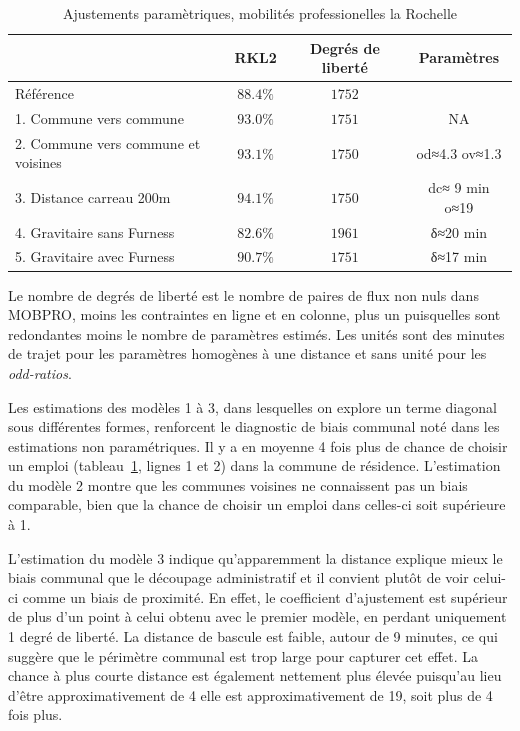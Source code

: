 \documentclass[
  10pt,
  a4paper,
  numbers=noendperiod,
  DIV=9]{scrartcl}
\begin{document}
\hypertarget{tbl-meapsR2-p}{}
\setlength{\LTpost}{0mm}
\begin{longtable}{lccc}
\caption{\label{tbl-meapsR2-p}Ajustements paramètriques, mobilités professionelles la Rochelle }\tabularnewline

\toprule
 & RKL2 & Degrés de liberté & Paramètres \\ 
\midrule
 Référence & $88.4\%$ & $1 752$ &  \\ 
1. Commune vers commune & $93.0\%$ & $1 751$ & NA \\ 
2. Commune vers commune et voisines & $93.1\%$ & $1 750$ & od≈4.3 ov≈1.3 \\ 
3. Distance carreau 200m & $94.1\%$ & $1 750$ & dc≈ 9 min o≈19 \\ 
4. Gravitaire sans Furness & $82.6\%$ & $1 961$ & δ≈20 min \\ 
5. Gravitaire avec Furness & $90.7\%$ & $1 751$ & δ≈17 min \\ 
\bottomrule
\end{longtable}
\begin{minipage}{\linewidth}
Le nombre de degrés de liberté est le nombre de paires de flux non nuls dans MOBPRO, moins les contraintes en ligne et en colonne, plus un puisqu\textquotesingle{}elles sont redondantes moins le nombre de paramètres estimés. Les unités sont des minutes de trajet pour les paramètres homogènes à une distance et sans unité pour les \emph{odd-ratios}.\\
\end{minipage}

Les estimations des modèles 1 à 3, dans lesquelles on explore un terme
diagonal sous différentes formes, renforcent le diagnostic de biais
communal noté dans les estimations non paramétriques. Il y a en moyenne
4 fois plus de chance de choisir un emploi (tableau~\ref{tbl-meapsR2-p},
lignes 1 et 2) dans la commune de résidence. L'estimation du modèle 2
montre que les communes voisines ne connaissent pas un biais comparable,
bien que la chance de choisir un emploi dans celles-ci soit supérieure à
1.

L'estimation du modèle 3 indique qu'apparemment la distance explique
mieux le biais communal que le découpage administratif et il convient
plutôt de voir celui-ci comme un biais de proximité. En effet, le
coefficient d'ajustement est supérieur de plus d'un point à celui obtenu
avec le premier modèle, en perdant uniquement 1 degré de liberté. La
distance de bascule est faible, autour de 9 minutes, ce qui suggère que
le périmètre communal est trop large pour capturer cet effet. La chance
à plus courte distance est également nettement plus élevée puisqu'au
lieu d'être approximativement de 4 elle est approximativement de 19,
soit plus de 4 fois plus.
\end{document}
